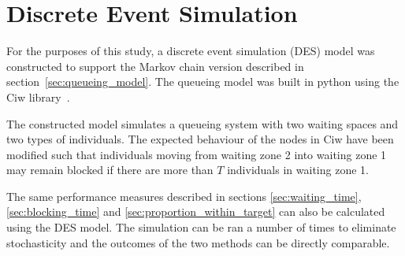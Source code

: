 \section{Discrete Event Simulation}\label{sec:appendix_des}

For the purposes of this study, a discrete event simulation (DES) model was
constructed to support the Markov chain version described in 
section~\ref{sec:queueing_model}.
The queueing model was built in python using the Ciw 
library~\cite{ciwpython}.

The constructed model simulates a queueing system with two waiting spaces and 
two types of individuals. 
The expected behaviour of the nodes in Ciw have been modified such that 
individuals moving from waiting zone 2 into waiting zone 1 may remain blocked 
if there are more than \(T\) individuals in waiting zone 1.

The same performance measures described in sections 
\ref{sec:waiting_time}, \ref{sec:blocking_time} and 
\ref{sec:proportion_within_target} can also be calculated using the DES model.
The simulation can be ran a number of times to eliminate stochasticity and the
outcomes of the two methods can be directly comparable. 

